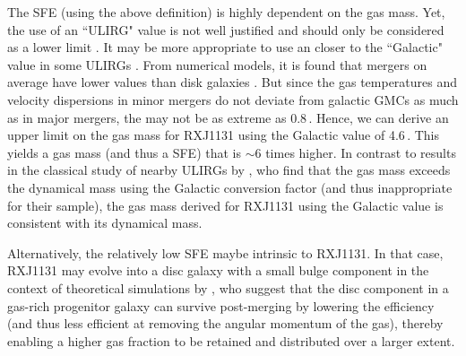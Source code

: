 \documentclass[]{emulateapj}
\begin{document}
The SFE (using the above definition) is highly dependent on the gas mass.
Yet, the use of an ``ULIRG" \alphaco value is not well justified and 
should only be considered as a lower limit .
It may be more appropriate to use an \alphaco closer to the ``Galactic" value in 
some ULIRGs \citep[\eg][]{Papadopoulos12a}. 
From numerical models, it is found that mergers on average have lower \alphaco values than
disk galaxies \citep{Narayanan12a}.
But since the gas temperatures and velocity dispersions in minor mergers do not deviate from 
galactic GMCs as much as in major mergers, the \alphaco may not be as extreme as 0.8\,\alphaU.
Hence,
we can derive an upper limit on the gas mass for RXJ1131 
using the Galactic value of 4.6\,\alphaU. This yields
a gas mass (and thus a SFE) that is $\sim$6 times higher.  
In contrast to results in the classical study of nearby ULIRGs by , who find that
the gas mass exceeds the dynamical mass using 
the Galactic conversion factor 
(and thus inappropriate for their sample), the gas mass derived for
RXJ1131 using the Galactic value is consistent with its dynamical mass.

Alternatively, the relatively low SFE maybe intrinsic to RXJ1131.
In that case,  RXJ1131 may evolve into a disc galaxy with a small bulge component
in the context of theoretical simulations by \citet{Hopkins09a}, who suggest 
that the disc component in a gas-rich progenitor galaxy can survive post-merging
by lowering the \SF efficiency (and thus less efficient at removing the angular momentum of
the gas), thereby enabling a higher gas fraction to be retained and 
distributed over a larger extent.
%
 
\end{document}
